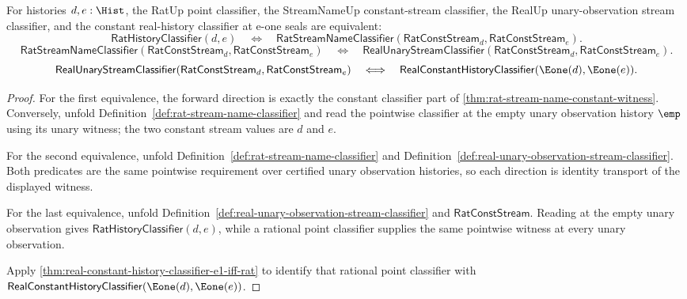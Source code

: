 \begin{theorem}
\label{thm:streamname-real-constant-prefix-bridge}
For histories $d,e:\Hist$, the RatUp point classifier, the StreamNameUp
constant-stream classifier, the RealUp unary-observation stream classifier, and
the constant real-history classifier at e-one seals are equivalent:
$$
\mathsf{RatHistoryClassifier}(d,e)
\quad\Longleftrightarrow\quad
\mathsf{RatStreamNameClassifier}(\mathsf{RatConstStream}_d,
\mathsf{RatConstStream}_e).
$$
$$
\mathsf{RatStreamNameClassifier}(\mathsf{RatConstStream}_d,
\mathsf{RatConstStream}_e)
\quad\Longleftrightarrow\quad
\mathsf{RealUnaryStreamClassifier}(\mathsf{RatConstStream}_d,
\mathsf{RatConstStream}_e).
$$
$$
\mathsf{RealUnaryStreamClassifier}(\mathsf{RatConstStream}_d,
\mathsf{RatConstStream}_e)
\quad\Longleftrightarrow\quad
\mathsf{RealConstantHistoryClassifier}(\Eone(d),\Eone(e)).
$$
\end{theorem}
\begin{proof}
For the first equivalence, the forward direction is exactly the constant
classifier part of \autoref{thm:rat-stream-name-constant-witness}. Conversely,
unfold Definition~\ref{def:rat-stream-name-classifier} and read the pointwise
classifier at the empty unary observation history $\emp$ using its unary
witness; the two constant stream values are $d$ and $e$.

For the second equivalence, unfold
Definition~\ref{def:rat-stream-name-classifier} and
Definition~\ref{def:real-unary-observation-stream-classifier}. Both predicates
are the same pointwise requirement over certified unary observation histories,
so each direction is identity transport of the displayed witness.

For the last equivalence, unfold
Definition~\ref{def:real-unary-observation-stream-classifier} and
$\mathsf{RatConstStream}$. Reading at the empty unary observation gives
$\mathsf{RatHistoryClassifier}(d,e)$, while a rational point classifier supplies
the same pointwise witness at every unary observation.

Apply \autoref{thm:real-constant-history-classifier-e1-iff-rat} to identify that
rational point classifier with
$\mathsf{RealConstantHistoryClassifier}(\Eone(d),\Eone(e))$.
\end{proof}

